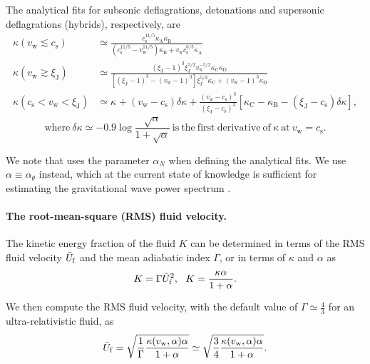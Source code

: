 \documentclass[10pt]{article}
\begin{document}
The analytical fits for subsonic deflagrations, detonations and supersonic deflagrations (hybrids), respectively, are
\begin{align}
    \kappa(v_\mathrm{w} \lesssim c_\mathrm{s}) &\simeq \frac{c_\mathrm{s}^{11/5} \kappa_\mathrm{A}\kappa_\mathrm{B}}{(c_\mathrm{s}^{11/5}-v_\mathrm{w}^{11/5})\kappa_\mathrm{B} + v_\mathrm{w} c_\mathrm{s}^{6/5} \kappa_\mathrm{A}} \\
    \kappa(v_\mathrm{w} \gtrsim \xi_\mathrm{J}) &\simeq \frac{(\xi_\mathrm{J}-1)^3 \xi_\mathrm{J}^{5/2} v_\mathrm{w}^{-5/2} \kappa_\mathrm{C}\kappa_\mathrm{D}}{[(\xi_\mathrm{J}-1)^3-(v_\mathrm{w}-1)^3] \xi_\mathrm{J}^{5/2} \kappa_\mathrm{C} + (v_\mathrm{w}-1)^3 \kappa_\mathrm{D}} \\
    \kappa(c_\mathrm{s}<v_\mathrm{w}<\xi_\mathrm{J}) &\simeq \kappa_\mathrm{} + (v_\mathrm{w}-c_\mathrm{s})\delta\kappa + \frac{(v_\mathrm{w}-c_\mathrm{s})^3}{(\xi_\mathrm{J}-c_\mathrm{s})^3}[\kappa_\mathrm{C}-\kappa_\mathrm{B}-(\xi_\mathrm{J}-c_\mathrm{s})\delta\kappa],
\end{align}
\begin{equation}
    \mathrm{where} \ \delta\kappa \simeq -0.9\log{\frac{\sqrt{\alpha}}{1+\sqrt{\alpha}}} \ \mathrm{is \ the \ first \ derivative \ of} \ \kappa \ \mathrm{at} \ v_\mathrm{w}=c_\mathrm{s}.
\end{equation}

We note that \cite{espinosa10} uses the parameter $\alpha_N$ when defining the analytical fits. We use $\alpha\equiv\alpha_\theta$ instead, which at the current state of knowledge is sufficient for estimating the gravitational wave power spectrum \cite{lisa19}.

\paragraph{The root-mean-square (RMS) fluid velocity.}
The kinetic energy fraction of the fluid $K$ can be determined in terms of the RMS fluid velocity $\Bar{U}_\mathrm{f}$ and the mean adiabatic index $\Gamma$, or in terms of $\kappa$ and $\alpha$ \cite{lisa19} as
\begin{equation}
    K = \Gamma \Bar{U}_\mathrm{f}^2, \ \ K = \frac{\kappa\alpha}{1+\alpha}.
\end{equation}

We then compute the RMS fluid velocity, with the default value of $\Gamma\simeq\frac{4}{3}$ for an ultra-relativistic fluid, as
\begin{equation}
    \Bar{U}_\mathrm{f} = \sqrt{\frac{1}{\Gamma}\frac{\kappa(v_\mathrm{w},\alpha) \alpha}{1+\alpha}} \simeq \sqrt{\frac{3}{4}\frac{\kappa(v_\mathrm{w},\alpha) \alpha}{1+\alpha}}.
\end{equation}
\end{document}
